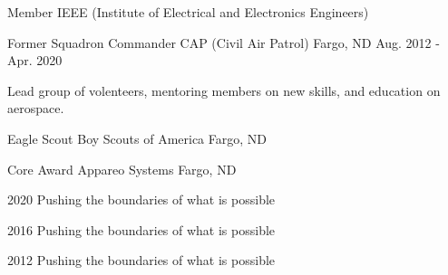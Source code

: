 

\begin{cventries}

  \cventry
    {Member} %
    {IEEE (Institute of Electrical and Electronics Engineers)} %
    {} %
    {} %
    {
      \begin{cvitems} %
      \end{cvitems}
    }

  \cventry
    {Former Squadron Commander} %
    {CAP (Civil Air Patrol)} %
    {Fargo, ND} %
    {Aug. 2012 - Apr. 2020} %
    {
      \begin{cvitems} %
        \item {Lead group of volenteers, mentoring members on new skills, and education on aerospace.}
      \end{cvitems}
    }

  \cventry
    {Eagle Scout} %
    {Boy Scouts of America} %
    {Fargo, ND} %
    {} %
    {
      \begin{cvitems} %
      \end{cvitems}
    }

  \cventry
    {Core Award} %
    {Appareo Systems} %
    {Fargo, ND} %
    {} %
    {
      \begin{cvitems} %
        \item {2020 Pushing the boundaries of what is possible}
        \item {2016 Pushing the boundaries of what is possible}
        \item {2012 Pushing the boundaries of what is possible}
      \end{cvitems}
    }

\end{cventries}

